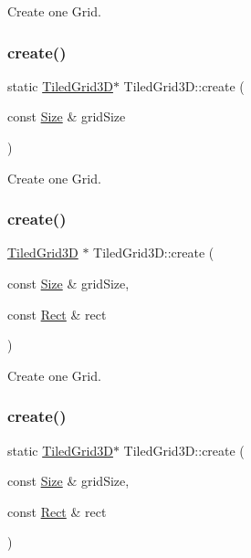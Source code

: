 Create one Grid. \mbox{\label{classTiledGrid3D_a696e6e1d963c1fe3ca950bf195a77090}} 
\subsubsection{\texorpdfstring{create()}{create()}\hspace{0.1cm}{\footnotesize\ttfamily [2/8]}}
{\footnotesize\ttfamily static \hyperlink{classTiledGrid3D}{Tiled\+Grid3D}$\ast$ Tiled\+Grid3\+D\+::create (\begin{DoxyParamCaption}\item[{const \hyperlink{classSize}{Size} \&}]{grid\+Size }\end{DoxyParamCaption})\hspace{0.3cm}{\ttfamily [static]}}

Create one Grid. \mbox{\label{classTiledGrid3D_aa5e8fb9cda28df06209047b216191397}} 
\subsubsection{\texorpdfstring{create()}{create()}\hspace{0.1cm}{\footnotesize\ttfamily [3/8]}}
{\footnotesize\ttfamily \hyperlink{classTiledGrid3D}{Tiled\+Grid3D} $\ast$ Tiled\+Grid3\+D\+::create (\begin{DoxyParamCaption}\item[{const \hyperlink{classSize}{Size} \&}]{grid\+Size,  }\item[{const \hyperlink{classRect}{Rect} \&}]{rect }\end{DoxyParamCaption})\hspace{0.3cm}{\ttfamily [static]}}

Create one Grid. \mbox{\label{classTiledGrid3D_ad97376762244c6f7cacfa14917654033}} 
\subsubsection{\texorpdfstring{create()}{create()}\hspace{0.1cm}{\footnotesize\ttfamily [4/8]}}
{\footnotesize\ttfamily static \hyperlink{classTiledGrid3D}{Tiled\+Grid3D}$\ast$ Tiled\+Grid3\+D\+::create (\begin{DoxyParamCaption}\item[{const \hyperlink{classSize}{Size} \&}]{grid\+Size,  }\item[{const \hyperlink{classRect}{Rect} \&}]{rect }\end{DoxyParamCaption})\hspace{0.3cm}{\ttfamily [static]}}

